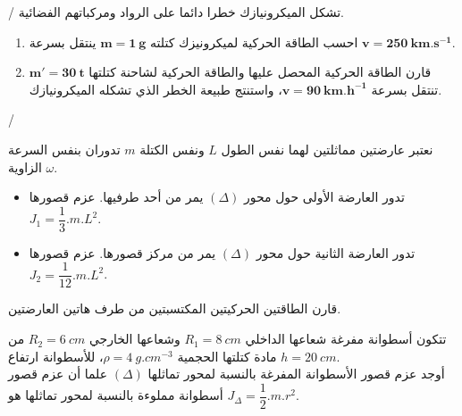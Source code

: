 \documentclass[12pt,a4paper]{article}
\begin{document}
  
					\begin{exercice}{}/
					تشكل الميكرونيازك خطرا دائما على الرواد ومركباتهم الفضائية.
\begin{enumerate}
\item احسب الطاقة الحركية لميكرونيزك كتلته 
$\bm{m=1\ g}$
ينتقل بسرعة
$\bm{v=250\ km.s^{-1}}$.
\item قارن الطاقة الحركية المحصل عليها والطاقة الحركية 
لشاحنة كتلتها 
$\bm{m'=30\ t}$
تنتقل بسرعة
$\bm{v=90\ km.h^{-1}}$، واستنتج طبيعة الخطر الذي
تشكله الميكرونيازك. 
					\end{enumerate}
					\end{exercice}%
					\begin{exercice}{}/
\begin{enumerate}
					\item 	نعتبر عارضتين مماثلتين لهما نفس الطول 
	$L$				
					ونفس الكتلة 
	$m$				
					تدوران بنفس السرعة الزاوية 
	$\omega$.				
					\begin{itemize}
					\item تدور العارضة الأولى حول محور 
					$(\Delta)$
					يمر من أحد طرفيها.
					عزم قصورها 
					$J_{1}=\dfrac{1}{3}.m.L^{2}$.
					\item تدور العارضة الثانية حول محور 
					$(\Delta)$
					يمر من مركز قصورها.
					عزم قصورها 
					$J_{2}=\dfrac{1}{12}.m.L^{2}$.
					\end{itemize}
					قارن الطاقتين الحركيتين المكتسبتين من طرف هاتين العارضتين.\\
\begin{minipage}[c]{0.73\linewidth}
\item تتكون أسطوانة مفرغة شعاعها الداخلي 
$R_1=8\ cm$
وشعاعها الخارجي 
$R_2=6\ cm$
من مادة كتلتها الحجمية
$\rho =4\ g.cm^{-3}$،
للأسطوانة ارتفاع 
$h=20\ cm$.
\\أوجد عزم قصور الأسطوانة المفرغة بالنسبة لمحور تماثلها
$(\Delta)$
علما أن عزم قصور أسطوانة مملوءة بالنسبة لمحور تماثلها هو 
$J_{\Delta}=\dfrac{1}{2}.m.r^{2}$.
\end{minipage}
					\begin{minipage}[c]{0.25\linewidth}
\begin{flushleft}
\begin{adjustbox}{width=0.7\linewidth}
\end{adjustbox}
\end{flushleft}
\end{minipage}
\end{enumerate}
\end{exercice}
\end{document}
